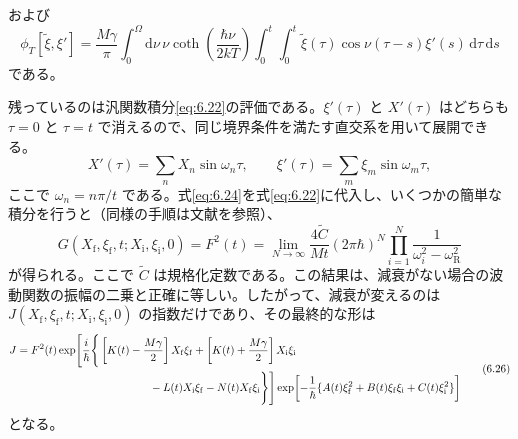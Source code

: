 および
\begin{equation}
\phi_T[\tilde\xi,\xi']=\frac{M\gamma}{\pi}\int_0^\Omega
\mathrm d\nu\,\nu\coth\!\left(\frac{\hbar\nu}{2kT}\right)
\int_0^t\int_0^t\tilde\xi(\tau)\cos\nu(\tau-s)\xi'(s)\,\mathrm d\tau\,\mathrm ds
\tag{6.23}\label{eq:6.23}
\end{equation}
である。

残っているのは汎関数積分\eqref{eq:6.22}の評価である。$\xi'(\tau)$ と $X'(\tau)$ はどちらも $\tau=0$ と $\tau=t$ で消えるので、同じ境界条件を満たす直交系を用いて展開できる\cite{ref22}。
\begin{equation}
X'(\tau)=\sum_nX_n\sin\omega_n\tau,\qquad
\xi'(\tau)=\sum_m\xi_m\sin\omega_m\tau,
\tag{6.24}\label{eq:6.24}
\end{equation}
ここで $\omega_n=n\pi/t$ である。式\eqref{eq:6.24}を式\eqref{eq:6.22}に代入し、いくつかの簡単な積分を行うと（同様の手順は文献\cite{ref22}を参照）、
\begin{equation}
G(X_{\mathrm f},\xi_{\mathrm f},t;X_{\mathrm i},\xi_{\mathrm i},0)
=F^2(t)=\lim_{N\to\infty}\frac{4\tilde C}{Mt}
(2\pi\hbar)^N\prod_{i=1}^N\frac1{\omega_i^2-\omega_{\mathrm R}^2}
\tag{6.25}\label{eq:6.25}
\end{equation}
が得られる。ここで $\tilde C$ は規格化定数である。この結果は、減衰がない場合の波動関数の振幅の二乗と正確に等しい。したがって、減衰が変えるのは $J(X_{\mathrm f},\xi_{\mathrm f},t;X_{\mathrm i},\xi_{\mathrm i},0)$ の指数だけであり、その最終的な形は
\begin{equation}
\begin{aligned}
J={}&F^2(t)\exp\!\Bigg[\frac{i}{\hbar}\Bigg\{
\left[K(t)-\frac{M\gamma}{2}\right]X_{\mathrm f}\xi_{\mathrm f}
+\left[K(t)+\frac{M\gamma}{2}\right]X_{\mathrm i}\xi_{\mathrm i}\\
&\hspace{38mm}-L(t)X_{\mathrm i}\xi_{\mathrm f}
-N(t)X_{\mathrm f}\xi_{\mathrm i}\Bigg\}\Bigg]
\exp\!\left[-\frac1\hbar\{A(t)\xi_{\mathrm f}^2
+B(t)\xi_{\mathrm f}\xi_{\mathrm i}+C(t)\xi_{\mathrm i}^2\}\right]
\end{aligned}
\tag{6.26}\label{eq:6.26}
\end{equation}
となる。

